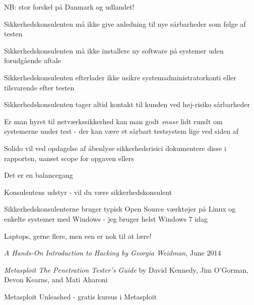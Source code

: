 \documentclass[20pt,landscape,a4paper,footrule]{foils}
\begin{document}
\begin{list2}
\item NB: stor forskel på Danmark og udlandet!
\item Sikkerhedskonsulenten må ikke give anledning til nye sårbarheder
  som følge af testen
\item Sikkerhedskonsulenten må ikke installere ny software på
  systemer uden forudgående aftale
\item Sikkerhedskonsulenten efterlader ikke usikre
  systemadministratorkonti eller tilsvarende efter testen
\item Sikkerhedskonsulenten tager altid kontakt til kunden ved
  høj-risiko sårbarheder  
\item Er man hyret til netværkssikkerhed kan man godt \emph{snuse}
  lidt rundt om systemerne under test - der kan være et sårbart
  testsystem lige ved siden af
\item Solido vil ved opdagelse af åbenlyse sikkerhedsrisici
  dokumentere disse i rapporten, uanset scope for opgaven ellers
\end{list2}

\centerline{Det er en balancegang}



\centerline{Konsulentens udstyr - vil du være sikkerhedskonsulent}

\begin{list1}
\item Sikkerhedskonsulenterne bruger typisk Open Source værktøjer på Linux og
enkelte systemer med Windows - jeg bruger helst Windows 7 idag
\item Laptops, gerne flere, men een er nok til at lære!
\begin{list2}
\item \emph{A Hands-On Introduction to Hacking
by Georgia Weidman}, June 2014\\
\item \emph{Metasploit The Penetration Tester's Guide}
by David Kennedy, Jim O'Gorman, Devon Kearns, and Mati Aharoni\\
\item Metasploit Unleashed - gratis kursus i Metasploit\\
\end{list2}
\end{list1}


\end{document}
